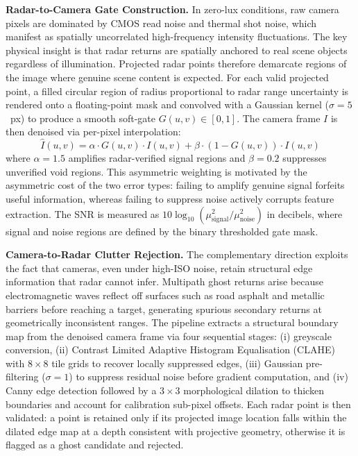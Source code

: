 \documentclass[conference]{IEEEtran}
\begin{document}
\textbf{Radar-to-Camera Gate Construction.} In zero-lux conditions, raw camera pixels are dominated by CMOS read noise and thermal shot noise, which manifest as spatially uncorrelated high-frequency intensity fluctuations. The key physical insight is that radar returns are spatially anchored to real scene objects regardless of illumination. Projected radar points therefore demarcate regions of the image where genuine scene content is expected. For each valid projected point, a filled circular region of radius proportional to radar range uncertainty is rendered onto a floating-point mask and convolved with a Gaussian kernel ($\sigma = 5$~px) to produce a smooth soft-gate $G(u,v) \in [0, 1]$. The camera frame $I$ is then denoised via per-pixel interpolation:
\begin{equation}
\hat{I}(u,v) = \alpha \cdot G(u,v) \cdot I(u,v) + \beta \cdot (1 - G(u,v)) \cdot I(u,v)
\end{equation}
where $\alpha = 1.5$ amplifies radar-verified signal regions and $\beta = 0.2$ suppresses unverified void regions. This asymmetric weighting is motivated by the asymmetric cost of the two error types: failing to amplify genuine signal forfeits useful information, whereas failing to suppress noise actively corrupts feature extraction. The SNR is measured as $10 \log_{10}(\mu_{\text{signal}}^2 / \mu_{\text{noise}}^2)$ in decibels, where signal and noise regions are defined by the binary thresholded gate mask.

\textbf{Camera-to-Radar Clutter Rejection.} The complementary direction exploits the fact that cameras, even under high-ISO noise, retain structural edge information that radar cannot infer. Multipath ghost returns arise because electromagnetic waves reflect off surfaces such as road asphalt and metallic barriers before reaching a target, generating spurious secondary returns at geometrically inconsistent ranges. The pipeline extracts a structural boundary map from the denoised camera frame via four sequential stages: (i) greyscale conversion, (ii) Contrast Limited Adaptive Histogram Equalisation (CLAHE) with $8 \times 8$ tile grids to recover locally suppressed edges, (iii) Gaussian pre-filtering ($\sigma = 1$) to suppress residual noise before gradient computation, and (iv) Canny edge detection followed by a $3 \times 3$ morphological dilation to thicken boundaries and account for calibration sub-pixel offsets. Each radar point is then validated: a point is retained only if its projected image location falls within the dilated edge map at a depth consistent with projective geometry, otherwise it is flagged as a ghost candidate and rejected.
\end{document}
